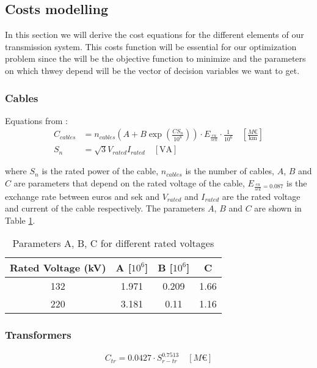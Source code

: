 \documentclass[a4paper,11pt, titlepage, twoside]{article}
\begin{document}
\subsection{Costs modelling}

In this section we will derive the cost equations for the different elements of our transmission system. This costs function will be essential for our optimization problem since
the will be the objective function to minimize and the parameters on which thwey depend will be the vector of decision variables we want to get.
\subsubsection{Cables}

Equations from \cite{chalmers}:
\begin{align}
    C_{cables} &= n_{cables} (A + B \exp(\frac{CS_n}{10^8})) \cdot E_{\frac{eu}{sek}} \cdot \frac{1}{10^6} \quad \left[\frac{M\euro}{\text{km}}\right] \\
    S_n &= \sqrt{3}V_{rated}I_{rated} \quad \left[\text{VA}\right]
\end{align}

where $S_n$ is the rated power of the cable, $n_{cables}$ is the number of cables, $A$, $B$ and $C$ are parameters that depend on the rated voltage of the cable, $E_{\frac{eu}{sek}=0.087}$ is the exchange rate between euros and sek and $V_{rated}$ and $I_{rated}$ are the rated voltage and current of the cable respectively.
The parameters $A$, $B$ and $C$ are shown in Table \ref{tab:parameterscab}. 
\begin{table}[h]
    \centering
    \begin{tabular}{c|c|c|c}
    \hline
    \textbf{Rated Voltage (kV)} & \textbf{A [$10^6$]} & \textbf{B [$10^6$]} & \textbf{C} \\
    \hline
    132 & 1.971 & 0.209 & 1.66 \\
    220 & 3.181 & 0.11 & 1.16 \\
    \hline
    \end{tabular}
    \caption{Parameters A, B, C for different rated voltages \cite{chalmers}}
    \label{tab:parameterscab}
    \end{table}


\subsubsection{Transformers}

\begin{equation}
    C_{tr}= 0.0427 \cdot S_{r-tr}^{0.7513} \quad \left[M\euro\right]
\end{equation}
\end{document}
